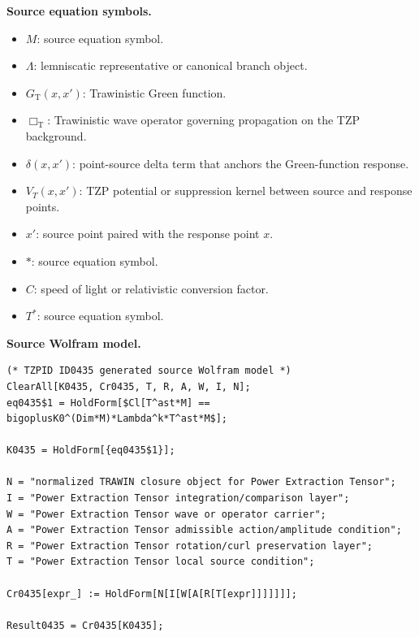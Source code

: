 \begin{minipage}[t]{0.49\linewidth}
\begingroup
\small
\raggedright
\textbf{Source equation symbols.}\par
\begin{itemize}[leftmargin=1.35em,itemsep=1pt,topsep=1pt,parsep=0pt]
    \item $M$: source equation symbol.
    \item $\Lambda$: lemniscatic representative or canonical branch object.
    \item $G_{\mathrm{T}}(x,x')$: Trawinistic Green function.
    \item $\Box_{\mathrm{T}}$: Trawinistic wave operator governing propagation on the TZP background.
    \item $\delta(x,x')$: point-source delta term that anchors the Green-function response.
    \item $V_{T}(x,x')$: TZP potential or suppression kernel between source and response points.
    \item $x'$: source point paired with the response point $x$.
    \item $\ast$: source equation symbol.
    \item $C$: speed of light or relativistic conversion factor.
    \item $T^{\ast}$: source equation symbol.
\end{itemize}
\endgroup
\end{minipage}\hfill
\begin{minipage}[t]{0.47\linewidth}
\begingroup
\scriptsize
\raggedright
\textbf{Source Wolfram model.}\par
\begin{Verbatim}[fontsize=\tiny,breaklines=true,breakanywhere=true]
(* TZPID ID0435 generated source Wolfram model *)
ClearAll[K0435, Cr0435, T, R, A, W, I, N];
eq0435$1 = HoldForm[$Cl[T^ast*M] == bigoplusK0^(Dim*M)*Lambda^k*T^ast*M$];

K0435 = HoldForm[{eq0435$1}];

N = "normalized TRAWIN closure object for Power Extraction Tensor";
I = "Power Extraction Tensor integration/comparison layer";
W = "Power Extraction Tensor wave or operator carrier";
A = "Power Extraction Tensor admissible action/amplitude condition";
R = "Power Extraction Tensor rotation/curl preservation layer";
T = "Power Extraction Tensor local source condition";

Cr0435[expr_] := HoldForm[N[I[W[A[R[T[expr]]]]]]];

Result0435 = Cr0435[K0435];
\end{Verbatim}
\endgroup
\end{minipage}

